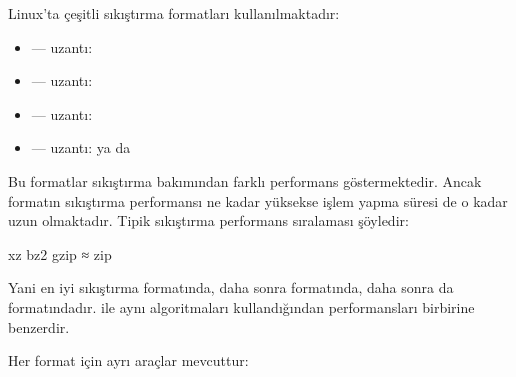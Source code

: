 \documentclass[a4paper,10pt,turkish]{sphinxmanual}
\begin{document}
\sphinxAtStartPar
Linux’ta çeşitli sıkıştırma formatları kullanılmaktadır:
\begin{itemize}
\item {} 
\sphinxAtStartPar
{} — uzantı: 

\item {} 
\sphinxAtStartPar
{} — uzantı: 

\item {} 
\sphinxAtStartPar
{} — uzantı: 

\item {} 
\sphinxAtStartPar
{} — uzantı:  ya da 

\end{itemize}

\sphinxAtStartPar
Bu formatlar sıkıştırma bakımından farklı performans göstermektedir. Ancak formatın sıkıştırma
performansı ne kadar yüksekse işlem yapma süresi de o kadar uzun olmaktadır. Tipik sıkıştırma
performans sıralaması şöyledir:

\begin{sphinxVerbatim}[commandchars=\\\{\}]
xz  \PYGZgt{}  bz2  \PYGZgt{}  gzip ≈ zip
\end{sphinxVerbatim}

\sphinxAtStartPar
Yani en iyi sıkıştırma  formatında, daha sonra  formatında, daha sonra da 
formatındadır.  ile  aynı algoritmaları kullandığından performansları birbirine benzerdir.

\sphinxAtStartPar
Her format için ayrı araçlar mevcuttur:
\end{document}
